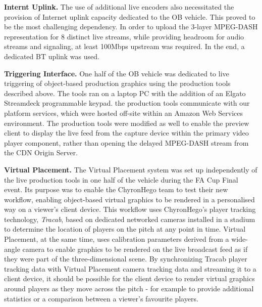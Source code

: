 \documentclass[sigchi-a, authorversion]{acmart}
\begin{document}
\vspace{5pt}\noindent\textbf{Internt Uplink.} The use of additional live encoders also necessitated
the provision of Internet uplink capacity dedicated to the OB vehicle. This
proved to be the most challenging dependency. In order to upload the 3-layer
MPEG-DASH representation for 8 distinct live streams, while providing headroom
for audio streams and signaling, at least 100Mbps upstream was required. In the
end, a dedicated BT uplink was used.

\vspace{5pt}\noindent\textbf{Triggering Interface.} One half of the OB vehicle was dedicated to live
triggering of object-based production graphics using the production tools
described above. The tools ran on a laptop PC with the addition of an Elgato
Streamdeck programmable keypad. the production tools communicate with our
platform services, which were hosted off-site within an Amazon Web Services
environment. The production tools were modified as well to enable the preview
client to display the live feed from the capture device within the primary video
player component, rather than opening the delayed MPEG-DASH stream from the CDN
Origin Server.

\vspace{5pt}\noindent\textbf{Virtual Placement.} The Virtual Placement system was set up independently
of the live production tools in one half of the vehicle during the FA Cup Final
event. Its purpose was to enable the ChyronHego team to test their new workflow,
enabling object-based virtual graphics to be rendered in a personalised way on
a viewer's client device. This workflow uses ChyronHego's player tracking
technology, \emph{Tracab}, based on dedicated networked cameras installed in a stadium
to determine the location of players on the pitch at any point in time. Virtual
Placement, at the same time, uses calibration parameters derived from a wide-angle
camera to enable graphics to be rendered on the live broadcast feed as if they
were part of the three-dimensional scene. By synchronizing Tracab player tracking
data with Virtual Placement camera tracking data and streaming it to a client
device, it should be possible for the client device to render virtual graphics
around players as they move across the pitch - for example to provide additional
statistics or a comparison between a viewer's favourite players.
\end{document}
